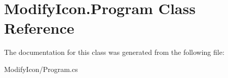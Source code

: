 \hypertarget{class_modify_icon_1_1_program}{\section{Modify\-Icon.\-Program Class Reference}
\label{class_modify_icon_1_1_program}
}


The documentation for this class was generated from the following file\-:\begin{DoxyCompactItemize}
\item 
Modify\-Icon/Program.\-cs\end{DoxyCompactItemize}
